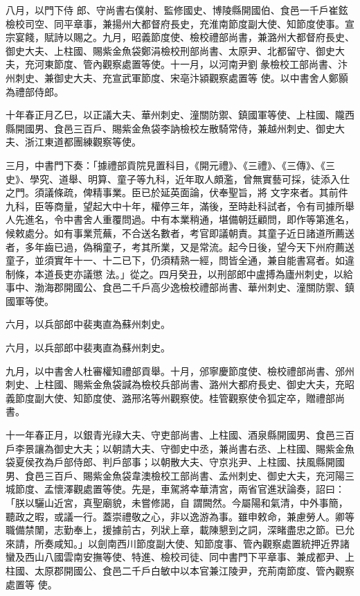 \begin{pinyinscope}
 八月，以門下侍
 郎、守尚書右僕射、監修國史、博陵縣開國伯、食邑一千戶崔鉉檢校司空、同平章事，兼揚州大都督府長史，充淮南節度副大使、知節度使事。宣宗宴餞，賦詩以賜之。九月，昭義節度使、檢校禮部尚書，兼潞州大都督府長史、御史大夫、上柱國、賜紫金魚袋鄭涓檢校刑部尚書、太原尹、北都留守、御史大夫，充河東節度、管內觀察處置等使。十一月，以河南尹劉彖檢校工部尚書、汴州刺史、兼御史大夫、充宣武軍節度、宋亳汴潁觀察處置等
 使。以中書舍人鄭顥為禮部侍郎。



 十年春正月乙巳，以正議大夫、華州刺史、潼關防禦、鎮國軍等使、上柱國、隴西縣開國男、食邑三百戶、賜紫金魚袋李訥檢校左散騎常侍，兼越州刺史、御史大夫、浙江東道都團練觀察等使。



 三月，中書門下奏：「據禮部貢院見置科目，《開元禮》、《三禮》、《三傳》、《三史》、學究、道舉、明算、童子等九科，近年取人頗濫，曾無實藝可採，徒添入仕之門。須議條疏，俾精事業。臣已於延英面論，伏奉聖旨，將
 文字來者。其前件九科，臣等商量，望起大中十年，權停三年，滿後，至時赴科試者，令有司據所舉人先進名，令中書舍人重覆問過。中有本業稍通，堪備朝廷顧問，即作等第進名，候敕處分。如有事業荒蕪，不合送名數者，考官即議朝責。其童子近日諸道所薦送者，多年齒已過，偽稱童子，考其所業，又是常流。起今日後，望今天下州府薦送童子，並須實年十一、十二已下，仍須精熟一經，問皆全通，兼自能書寫者。如違制條，本道長吏亦議懲
 法。」從之。四月癸丑，以刑部郎中盧搏為廬州刺史，以給事中、渤海郡開國公、食邑二千戶高少逸檢校禮部尚書、華州刺史、潼關防禦、鎮國軍等使。



 六月，以兵部郎中裴夷直為蘇州刺史。



 六月，以兵部郎中裴夷直為蘇州刺史。



 九月，以中書舍人杜審權知禮部貢舉。十月，邠寧慶節度使、檢校禮部尚書、邠州刺史、上柱國、賜紫金魚袋諴為檢校兵部尚書、潞州大都府長史、御史大夫，充昭義節度副大使、知節度使、潞邢洺等州觀察使。桂管觀察使令狐定卒，贈禮部尚書。



 十一年春正月，以銀青光祿大夫、守吏部尚書、上柱國、酒泉縣開國男、食邑三百戶李景讓為御史大夫；以朝請大夫、守御史中丞，兼尚書右丞、上柱國、賜紫金魚袋夏侯孜為戶部侍郎、判戶部事；以朝散大夫、守京兆尹、上柱國、扶風縣開國男、食邑三百戶、賜紫金魚袋韋澳檢校工部尚書、孟州刺史、御史大夫，充河陽三城節度、孟懷澤觀處置等使。先是，車駕將幸華清宮，兩省官進狀論奏，詔曰：「朕以驪山近宮，真聖廟貌，未嘗修謁，自
 謂闕然。今屬陽和氣清，中外事簡，聽政之暇，或議一行。蓋崇禮敬之心，非以逸游為事。雖申敕命，兼慮勞人。卿等職備禁闈，志勤奉上，援據前古，列狀上章，載陳懇到之詞，深睹盡忠之節。已允來請，所奏咸知。」以劍南西川節度副大使、知節度事、管內觀察處置統押近界諸蠻及西山八國雲南安撫等使、特進、檢校司徒、同中書門下平章事、兼成都尹、上柱國、太原郡開國公、食邑二千戶白敏中以本官兼江陵尹，充荊南節度、管內觀察處置等
 使。




\end{pinyinscope}
